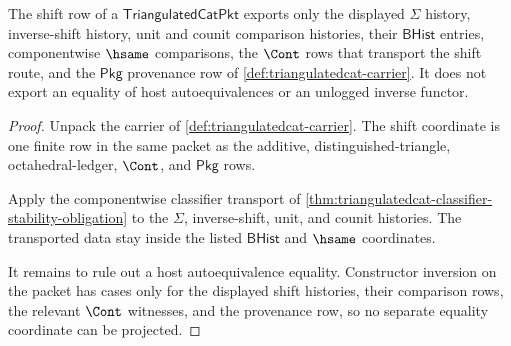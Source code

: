\begin{theorem}
\label{thm:triangulatedcat-shift-autoequivalence-obligation}
The shift row of a $\mathsf{TriangulatedCatPkt}$ exports only the displayed
$\Sigma$ history, inverse-shift history, unit and counit comparison histories,
their $\mathsf{BHist}$ entries, componentwise $\hsame$ comparisons, the
$\Cont$ rows that transport the shift route, and the $\mathsf{Pkg}$ provenance
row of \autoref{def:triangulatedcat-carrier}. It does not export an equality
of host autoequivalences or an unlogged inverse functor.
\end{theorem}
\begin{proof}
Unpack the carrier of \autoref{def:triangulatedcat-carrier}. The shift
coordinate is one finite row in the same packet as the additive,
distinguished-triangle, octahedral-ledger, $\Cont$, and $\mathsf{Pkg}$ rows.

Apply the componentwise classifier transport of
\autoref{thm:triangulatedcat-classifier-stability-obligation} to the
$\Sigma$, inverse-shift, unit, and counit histories. The transported data stay
inside the listed $\mathsf{BHist}$ and $\hsame$ coordinates.

It remains to rule out a host autoequivalence equality. Constructor inversion
on the packet has cases only for the displayed shift histories, their
comparison rows, the relevant $\Cont$ witnesses, and the provenance row, so no
separate equality coordinate can be projected.
\end{proof}

